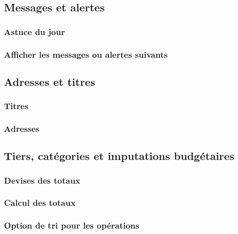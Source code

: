\subsection{Messages et alertes\label{setup-display-messages}}


\subsubsection{Astuce du jour\label{setup-display-messages-trick}}

\subsubsection{Afficher les messages ou alertes suivants}


\subsection{Adresses et titres\label{setup-display-addresses}}

\subsubsection{Titres\label{setup-display-addresses-titles}}

\subsubsection{Adresses\label{setup-display-addresses-address}}

\subsection{Tiers, catégories et imputations budgétaires\label{setup-display-third}}

\subsubsection{Devises des totaux\label{setup-display-third-currencies}}

\subsubsection{Calcul des totaux\label{setup-display-third-sum}}

\subsubsection{Option de tri pour les opérations\label{setup-display-third-sort}}

